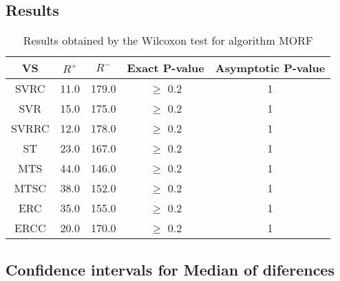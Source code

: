 \documentclass[a4paper,10pt]{article}
\begin{document}
\subsection{Results}

\begin{table}[!htp]
\centering\small
\begin{tabular}{
|c|c|c|c|c|}
\hline
 VS & $R^{+}$ & $R^{-}$ & Exact P-value & Asymptotic P-value \\ \hline 
SVRC & 11.0 & 179.0 & $\geq$ 0.2 & 1\\ \hline 
SVR & 15.0 & 175.0 & $\geq$ 0.2 & 1\\ \hline 
SVRRC & 12.0 & 178.0 & $\geq$ 0.2 & 1\\ \hline 
ST & 23.0 & 167.0 & $\geq$ 0.2 & 1\\ \hline 
MTS & 44.0 & 146.0 & $\geq$ 0.2 & 1\\ \hline 
MTSC & 38.0 & 152.0 & $\geq$ 0.2 & 1\\ \hline 
ERC & 35.0 & 155.0 & $\geq$ 0.2 & 1\\ \hline 
ERCC & 20.0 & 170.0 & $\geq$ 0.2 & 1\\ \hline 

\end{tabular}
\caption{Results obtained by the Wilcoxon test for algorithm MORF}
\end{table}

\subsection{Confidence intervals for Median of diferences}
\end{document}
